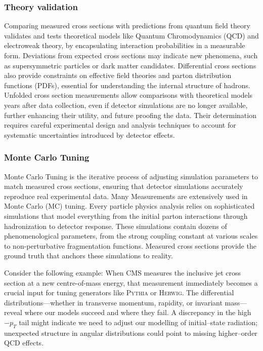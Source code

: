         \subsubsection{Theory validation}
            Comparing measured cross sections with predictions from quantum field theory validates and tests theoretical models like Quantum Chromodynamics (QCD) and electroweak theory, by encapsulating interaction probabilities in a measurable form.
            Deviations from expected cross sections may indicate new phenomena, such as supersymmetric particles or dark matter candidates.
            Differential cross sections also provide constraints on effective field theories and parton distribution functions (PDFs), essential for understanding the internal structure of hadrons.
            Unfolded cross section measurements allow comparisons with theoretical models years after data collection, even if detector simulations are no longer available, further enhancing their utility, and future proofing the data.
            Their determination requires careful experimental design and analysis techniques to account for systematic uncertainties introduced by detector effects.

        \subsubsection{Monte Carlo Tuning}
            Monte Carlo Tuning is the iterative process of adjusting simulation parameters to match measured cross sections, ensuring that detector simulations accurately reproduce real experimental data.
            Many Measurements are extensively used in Monte Carlo (MC) tuning.
            Every particle physics analysis relies on sophisticated simulations that model everything from the initial parton interactions through hadronization to detector response.
            These simulations contain dozens of phenomenological parameters, from the strong coupling constant at various scales to non-perturbative fragmentation functions.
            Measured cross sections provide the ground truth that anchors these simulations to reality.

            Consider the following example:
            When CMS measures the inclusive jet cross section at a new centre-of-mass energy, that measurement immediately becomes a crucial input for tuning generators like \textsc{Pythia} or \textsc{Herwig}.
            The differential distributions---whether in transverse momentum, rapidity, or invariant mass---reveal where our models succeed and where they fail.
            A discrepancy in the high\(-p_T\) tail might indicate we need to adjust our modelling of initial--state radiation; unexpected structure in angular distributions could point to missing higher--order QCD effects.
